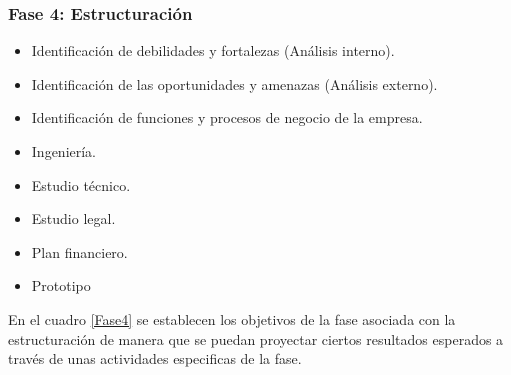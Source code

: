\subsubsection{Fase 4: Estructuración}
\begin{itemize}
    \item Identificación de debilidades y fortalezas (Análisis interno).
    \item Identificación de las oportunidades y amenazas (Análisis externo).
    \item Identificación de funciones y procesos de negocio de la empresa.
    \item Ingeniería.
    \item Estudio técnico.
    \item Estudio legal.
    \item Plan financiero.
    \item Prototipo
\end{itemize}

En el cuadro \ref{Fase4} se establecen los objetivos de la fase asociada con la estructuración de manera que se puedan proyectar ciertos resultados esperados a través de unas actividades especificas de la fase.

